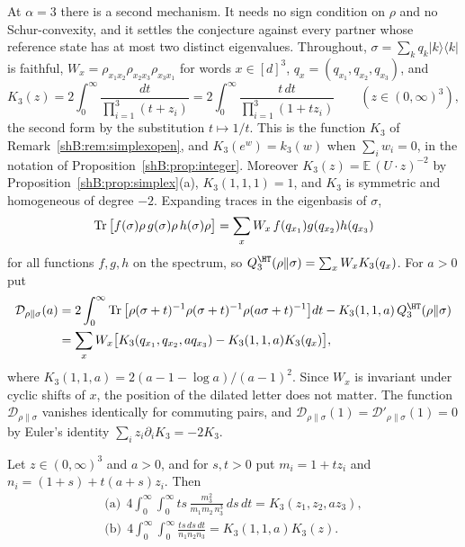 At $\alpha=3$ there is a second mechanism. It needs no sign condition on $\rho$ and no Schur-convexity, and it settles the conjecture against every partner whose reference state has at most two distinct eigenvalues. Throughout, $\sigma=\sum_kq_k|k\rangle\langle k|$ is faithful, $W_x=\rho_{x_1x_2}\rho_{x_2x_3}\rho_{x_3x_1}$ for words $x\in[d]^3$, $q_x=(q_{x_1},q_{x_2},q_{x_3})$, and
\[
K_3(z)=2\int_0^\infty\frac{dt}{\prod_{i=1}^3(t+z_i)}=2\int_0^\infty\frac{t\,dt}{\prod_{i=1}^3(1+tz_i)}\qquad(z\in(0,\infty)^3),
\]
the second form by the substitution $t\mapsto1/t$. This is the function $K_3$ of Remark~\ref{shB:rem:simplexopen}, and $K_3(e^w)=k_3(w)$ when $\sum_iw_i=0$, in the notation of Proposition~\ref{shB:prop:integer}. Moreover $K_3(z)=\mathbb E\,(U\cdot z)^{-2}$ by Proposition~\ref{shB:prop:simplex}(a), $K_3(1,1,1)=1$, and $K_3$ is symmetric and homogeneous of degree $-2$. Expanding traces in the eigenbasis of $\sigma$,
\begin{equation}\label{shB:eq:wordtrace}
\operatorname{Tr}\big[f(\sigma)\rho\,g(\sigma)\rho\,h(\sigma)\rho\big]=\sum_xW_x\,f(q_{x_1})g(q_{x_2})h(q_{x_3})
\end{equation}
for all functions $f,g,h$ on the spectrum, so $Q^\HT_3(\rho\|\sigma)=\sum_xW_xK_3(q_x)$. For $a>0$ put
\[
\begin{aligned}
\mathcal D_{\rho\|\sigma}(a)&=2\int_0^\infty\Tr\big[\rho(\sigma+t)^{-1}\rho(\sigma+t)^{-1}\rho(a\sigma+t)^{-1}\big]dt-K_3(1,1,a)\,Q^\HT_3(\rho\|\sigma)\\
&=\sum_xW_x\big[K_3(q_{x_1},q_{x_2},aq_{x_3})-K_3(1,1,a)K_3(q_x)\big],
\end{aligned}
\]
where $K_3(1,1,a)=2(a-1-\log a)/(a-1)^2$. Since $W_x$ is invariant under cyclic shifts of $x$, the position of the dilated letter does not matter. The function $\mathcal D_{\rho\|\sigma}$ vanishes identically for commuting pairs, and $\mathcal D_{\rho\|\sigma}(1)=\mathcal D'_{\rho\|\sigma}(1)=0$ by Euler's identity $\sum_iz_i\partial_iK_3=-2K_3$.

\begin{proposition}\label{shB:prop:twotime}
Let $z\in(0,\infty)^3$ and $a>0$, and for $s,t>0$ put $m_i=1+tz_i$ and $n_i=(1+s)+t(a+s)z_i$. Then
\begin{gather*}
\text{(a)}\ \ 4\int_0^\infty\!\!\int_0^\infty ts\,\frac{m_3^2}{m_1m_2\,n_3^3}\,ds\,dt=K_3(z_1,z_2,az_3),\\
\text{(b)}\ \ 4\int_0^\infty\!\!\int_0^\infty\frac{ts\,ds\,dt}{n_1n_2n_3}=K_3(1,1,a)K_3(z).
\end{gather*}
\end{proposition}

